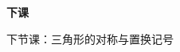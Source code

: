 \documentclass[10pt]{beamer}
\begin{document}
\begin{frame}
  \begin{center}
    \vspace{1.6cm}
    {\Large\textcolor{textgreen}{\bfseries 下课}}

    \vspace{1.0cm}
    {\large\textcolor{accentgreen}{下节课：三角形的对称与置换记号}}
  \end{center}
\end{frame}
\end{document}
